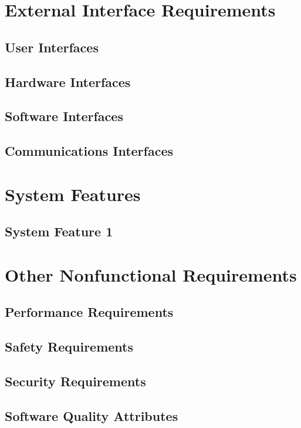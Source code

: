 \newpage




\chapter{External Interface Requirements}
\label{External Interface Requirements}

\section{User Interfaces}
\section{Hardware Interfaces}
\section{Software Interfaces}
\section{Communications Interfaces}


\chapter{System Features}
\label{System Features}

\section{System Feature 1}


\chapter{Other Nonfunctional Requirements}
\label{Other Nonfunctional Requirements}

\section{Performance Requirements}
\section{Safety Requirements}
\section{Security Requirements}
\section{Software Quality Attributes}
